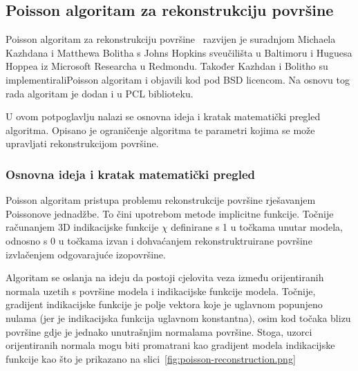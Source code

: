 

\newpage
\subsection{Poisson algoritam za rekonstrukciju površine} %
\label{sub:Poisson}

Poisson algoritam za rekonstrukciju površine~\cite{Kazhdan:2006}
razvijen je suradnjom Michaela Kazhdana i Matthewa Bolitha s Johns
Hopkins sveučilišta u Baltimoru i Huguesa Hoppea iz Microsoft Researcha
u Redmondu. Također Kazhdan i Bolitho su implementirali\footnotemark[1]
Poisson algoritam i objavili kod pod BSD licencom. Na osnovu tog rada
algoritam je dodan i u PCL biblioteku.

U ovom potpoglavlju nalazi se osnovna ideja i kratak matematički pregled
algoritma. Opisano je ograničenje algoritma te parametri kojima se može
upravljati rekonstrukcijom površine.



\subsubsection{Osnovna ideja i kratak matematički pregled} %
\label{ssub:Osnovna ideja i kratak matematički pregled}

Poisson algoritam pristupa problemu rekonstrukcije površine rješavanjem
Poissonove jednadžbe. To čini upotrebom metode implicitne funkcije.
Točnije računanjem 3D indikacijske funkcije \(\chi\) definirane s 1 u
točkama unutar modela, odnosno s 0 u točkama izvan i dohvaćanjem
rekonstruktruirane površine izvlačenjem odgovarajuće izopovršine.

Algoritam se oslanja na ideju da postoji cjelovita veza između
orijentiranih normala uzetih s površine modela i indikacijske funkcije
modela. Točnije, gradijent indikacijske funkcije je polje vektora koje
je uglavnom popunjeno nulama (jer je indikacijska funkcija uglavnom
konstantna), osim kod točaka blizu površine gdje je jednako unutrašnjim
normalama površine. Stoga, uzorci orijentiranih normala mogu biti
promatrani kao gradijent modela indikacijske funkcije kao što je
prikazano na slici~\ref{fig:poisson-reconstruction.png}

